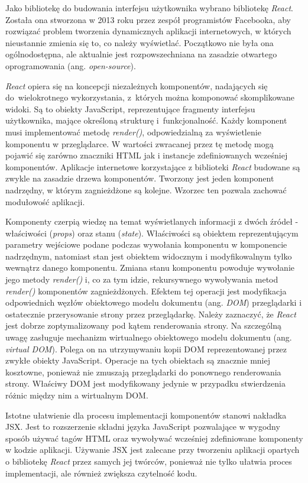 \documentclass[12pt,a4paper,polish,thesis]{dcsbook}
\begin{document}
{	 Jako bibliotekę do budowania interfejsu użytkownika wybrano bibliotekę \textit{React}.
	 Została ona stworzona w 2013 roku przez zespół programistów Facebooka, aby rozwiązać problem tworzenia dynamicznych aplikacji internetowych, w których nieustannie zmienia się to, co należy wyświetlać. Początkowo nie była ona ogólnodostępna, ale aktualnie jest rozpowszechniana na zasadzie otwartego oprogramowania (ang. \textit{open-source}).

   \textit{React} opiera się na koncepcji niezależnych komponentów, nadających się do~wielokrotnego wykorzystania, z~których można komponować skomplikowane widoki. Są to obiekty JavaScript, reprezentujące fragmenty interfejsu użytkownika, mające określoną strukturę i~funkcjonalność. Każdy komponent musi implementować metodę \textit{render()}, odpowiedzialną za wyświetlenie komponentu w przeglądarce. W wartości zwracanej przez tę metodę mogą pojawić się zarówno znaczniki HTML jak i instancje zdefiniowanych wcześniej komponentów. Aplikacje internetowe korzystające z biblioteki \textit{React} budowane są zwykle na zasadzie drzewa komponentów. Tworzony jest jeden komponent nadrzędny, w którym zagnieżdżone są kolejne. Wzorzec ten pozwala zachować modułowość aplikacji.

   Komponenty czerpią wiedzę na temat wyświetlanych informacji z dwóch źródeł - właściwości (\textit{props}) oraz stanu (\textit{state}). Właściwości są obiektem reprezentującym parametry wejściowe podane podczas wywołania komponentu w komponencie nadrzędnym, natomiast stan jest obiektem widocznym i modyfikowalnym tylko wewnątrz danego komponentu. Zmiana stanu komponentu powoduje wywołanie jego metody \textit{render()} i, co za tym idzie, rekursywnego wywoływania metod \textit{render()} komponentów zagnieżdżonych. Efektem tej operacji jest modyfikacja odpowiednich węzłów obiektowego modelu dokumentu (ang. \textit{DOM}) przeglądarki i ostatecznie przerysowanie strony przez przeglądarkę. Należy zaznaczyć, że \textit{React} jest dobrze zoptymalizowany pod kątem renderowania strony. Na szczególną uwagę zasługuje mechanizm wirtualnego obiektowego modelu dokumentu (ang. \textit{virtual DOM}). Polega on na utrzymywaniu kopii DOM reprezentowanej przez zwykłe obiekty JavaScript. Operacje na tych obiektach są znacznie mniej kosztowne, ponieważ nie zmuszają przeglądarki do ponownego renderowania strony. Właściwy DOM jest modyfikowany jedynie w przypadku stwierdzenia różnic między nim a wirtualnym DOM.

   Istotne ułatwienie dla procesu implementacji komponentów stanowi nakładka JSX. Jest to rozszerzenie składni języka JavaScript pozwalające w wygodny sposób używać tagów HTML oraz wywoływać wcześniej zdefiniowane komponenty w kodzie aplikacji. Używanie JSX jest zalecane przy tworzeniu aplikacji opartych o bibliotekę \textit{React} przez samych jej twórców, ponieważ nie tylko ułatwia proces implementacji, ale również zwiększa czytelność kodu.

}
\end{document}
